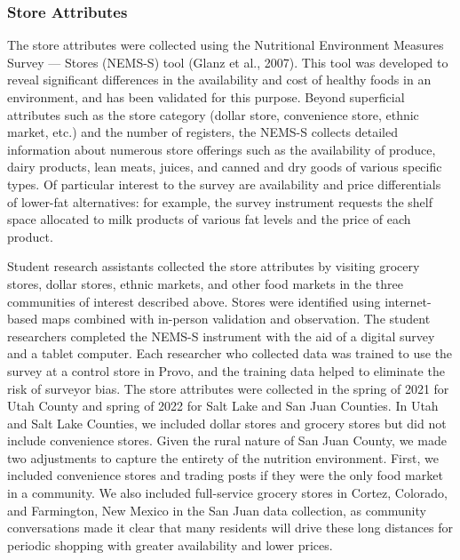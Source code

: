 \documentclass[
  letterpaper,
  number,
  review,
  3p]{elsarticle}
\begin{document}
\subsubsection{Store Attributes}\label{store-attributes}

The store attributes were collected using the Nutritional Environment
Measures Survey --- Stores (NEMS-S) tool (Glanz et al., 2007). This tool
was developed to reveal significant differences in the availability and
cost of healthy foods in an environment, and has been validated for this
purpose. Beyond superficial attributes such as the store category
(dollar store, convenience store, ethnic market, etc.) and the number of
registers, the NEMS-S collects detailed information about numerous store
offerings such as the availability of produce, dairy products, lean
meats, juices, and canned and dry goods of various specific types. Of
particular interest to the survey are availability and price
differentials of lower-fat alternatives: for example, the survey
instrument requests the shelf space allocated to milk products of
various fat levels and the price of each product.

Student research assistants collected the store attributes by visiting
grocery stores, dollar stores, ethnic markets, and other food markets in
the three communities of interest described above. Stores were
identified using internet-based maps combined with in-person validation
and observation. The student researchers completed the NEMS-S instrument
with the aid of a digital survey and a tablet computer. Each researcher
who collected data was trained to use the survey at a control store in
Provo, and the training data helped to eliminate the risk of surveyor
bias. The store attributes were collected in the spring of 2021 for Utah
County and spring of 2022 for Salt Lake and San Juan Counties. In Utah
and Salt Lake Counties, we included dollar stores and grocery stores but
did not include convenience stores. Given the rural nature of San Juan
County, we made two adjustments to capture the entirety of the nutrition
environment. First, we included convenience stores and trading posts if
they were the only food market in a community. We also included
full-service grocery stores in Cortez, Colorado, and Farmington, New
Mexico in the San Juan data collection, as community conversations made
it clear that many residents will drive these long distances for
periodic shopping with greater availability and lower prices.
\end{document}
